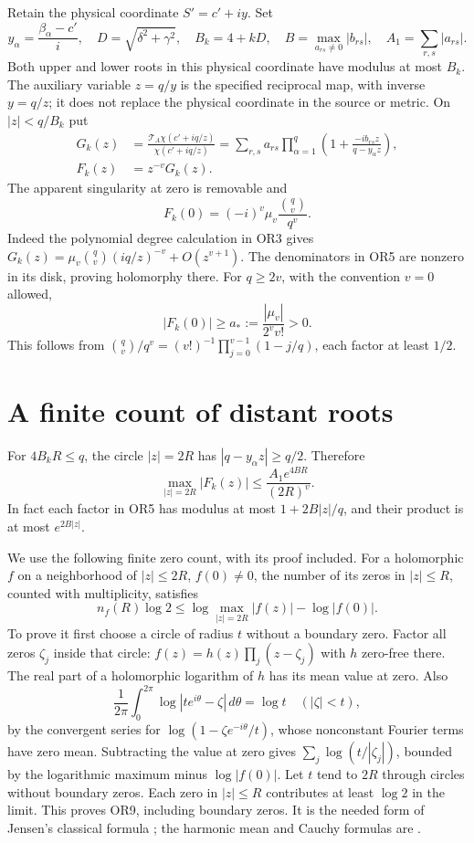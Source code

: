 \documentclass[11pt]{article}
\providecommand{\TA}{\mathcal T_A}\providecommand{\UA}{\mathcal U_A}
\begin{document}
Retain the physical coordinate $S'=c'+iy$. Set
\[
y_\alpha=\frac{\beta_\alpha-c'}i,\quad
D=\sqrt{\delta^2+\gamma^2},\quad B_k=4+kD,\quad
B=\max_{a_{rs}\ne0}|b_{rs}|,\quad A_1=\sum_{r,s}|a_{rs}|.
\tag{OR4}
\]
Both upper and lower roots in this physical coordinate have modulus
at most $B_k$. The auxiliary variable $z=q/y$ is the specified
reciprocal map, with inverse $y=q/z$; it does not replace the
physical coordinate in the source or metric. On $|z|<q/B_k$ put
\[
\begin{split}
G_k(z)&=\frac{\TA\chi(c'+iq/z)}{\chi(c'+iq/z)}
=\sum_{r,s}a_{rs}\prod_{\alpha=1}^q
 \left(1+\frac{-ib_{rs}z}{q-y_\alpha z}\right),\\
F_k(z)&=z^{-v}G_k(z).
\end{split}\tag{OR5}
\]
The apparent singularity at zero is removable and
\[
F_k(0)=(-i)^v\mu_v\frac{\binom qv}{q^v}.
\tag{OR6}
\]
Indeed the polynomial degree calculation in OR3 gives
$G_k(z)=\mu_v\binom qv(iq/z)^{-v}+O(z^{v+1})$.
The denominators in OR5 are nonzero in its disk, proving
holomorphy there. For $q\ge2v$, with the convention $v=0$ allowed,
\[
|F_k(0)|\ge a_*:=\frac{|\mu_v|}{2^v v!}>0.
\tag{OR7}
\]
This follows from $\binom qv/q^v=(v!)^{-1}
\prod_{j=0}^{v-1}(1-j/q)$, each factor at least $1/2$.

\section{A finite count of distant roots}
For $4B_kR\le q$, the circle $|z|=2R$ has
$|q-y_\alpha z|\ge q/2$. Therefore
\[
\max_{|z|=2R}|F_k(z)|
 \le \frac{A_1e^{4BR}}{(2R)^v}.
\tag{OR8}
\]
In fact each factor in OR5 has modulus at most
$1+2B|z|/q$, and their product is at most $e^{2B|z|}$.

We use the following finite zero count, with its proof included.
For a holomorphic $f$ on a neighborhood of $|z|\le2R$,
$f(0)\ne0$, the number of its zeros in $|z|\le R$, counted with
multiplicity, satisfies
\[
n_f(R)\log2\le
\log\max_{|z|=2R}|f(z)|-\log|f(0)|.
\tag{OR9}
\]
To prove it first choose a circle of radius $t$ without a boundary
zero. Factor all zeros $\zeta_j$ inside that circle:
$f(z)=h(z)\prod_j(z-\zeta_j)$ with $h$ zero-free there.
The real part of a holomorphic logarithm of $h$ has its mean value
at zero. Also
\[
\frac1{2\pi}\int_0^{2\pi}\log|te^{i\theta}-\zeta|\,d\theta=\log t
\quad(|\zeta|<t),
\]
by the convergent series for $\log(1-\zeta e^{-i\theta}/t)$,
whose nonconstant Fourier terms have zero mean. Subtracting the
value at zero gives $\sum_j\log(t/|\zeta_j|)$, bounded by the
logarithmic maximum minus $\log|f(0)|$.
Let $t$ tend to $2R$ through circles without boundary zeros.
Each zero in $|z|\le R$ contributes at least $\log2$ in the limit.
This proves OR9, including boundary zeros. It is the needed form
of Jensen's classical formula \cite{or-Jensen}; the harmonic mean
and Cauchy formulas are \cite[1.9.31, 1.9.33]{or-DLMF1}.
\end{document}
